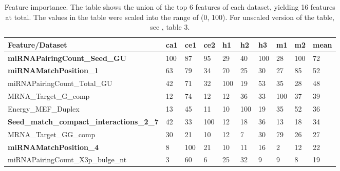 \documentclass{bmcart}
\begin{document}
\begin{table}[h!]
\caption{Feature importance. The table shows the union of the top 6 features of each dataset, yielding 16 features at total. The values in the table were scaled into the range of (0, 100). For unscaled version of the table, see , table 3.}
\label{tab:feature_importance}
\begin{tabular}{|l|l|l|l|l|l|l|l|l|l|}
\hline
\textbf{Feature/Dataset}                          & \textbf{ca1} & \textbf{ce1} & \textbf{ce2} & \textbf{h1} & \textbf{h2} & \textbf{h3} & \textbf{m1} & \textbf{m2} & \textbf{mean} \\ \hline
\textbf{miRNAPairingCount\_Seed\_GU}              & 100          & 87           & 95           & 29          & 40          & 100         & 28          & 100         & 72            \\ \hline
\textbf{miRNAMatchPosition\_1}                    & 63           & 79           & 34           & 70          & 25          & 30          & 27          & 85          & 52            \\ \hline
miRNAPairingCount\_Total\_GU                      & 42           & 71           & 32           & 100         & 19          & 53          & 35          & 28          & 48            \\ \hline
MRNA\_Target\_G\_comp                             & 12           & 74           & 12           & 12          & 36          & 33          & 100         & 37          & 39            \\ \hline
Energy\_MEF\_Duplex                               & 13           & 45           & 11           & 10          & 100         & 19          & 35          & 52          & 36            \\ \hline
\textbf{Seed\_match\_compact\_interactions\_2\_7} & 42           & 33           & 100          & 12          & 18          & 36          & 13          & 18          & 34            \\ \hline
MRNA\_Target\_GG\_comp                            & 30           & 21           & 10           & 12          & 7           & 30          & 79          & 26          & 27            \\ \hline
\textbf{miRNAMatchPosition\_4}                    & 8            & 100          & 21           & 10          & 11          & 16          & 2           & 12          & 22            \\ \hline
miRNAPairingCount\_X3p\_bulge\_nt                 & 3            & 60           & 6            & 25          & 32          & 9           & 9           & 8           & 19            \\ \hline

\end{tabular}
\end{table}
\end{document}
